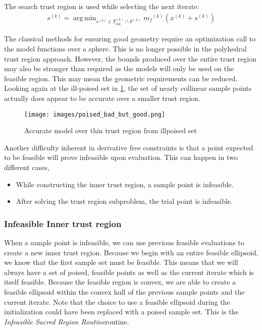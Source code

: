 \documentclass{article}
\theoremstyle{case}
\newcommand{\modelk}{{{m}_f}^{(k)}}
\newcommand{\iteratek}{{x}^{(k)}}
\newcommand{\trialk}{{{s}^{(k)}}}
\newcommand{\outertrk}{{T_{\text{out}}^{(k)}}}
\newcommand{\feasiblek}{{F}^{(k)}}
\DeclareMathOperator*{\argmin}{arg\,min}
\newcommand{\infeasiblesacred}{\emph{Infeasible Sacred Region Routine}}
\begin{document}
The search trust region is used while selecting the next iterate:
\begin{align*}
\trialk = \argmin_{\trialk \in \outertrk \cap \feasiblek} \modelk(\iteratek + \trialk)
\end{align*}


The classical methods for ensuring good geometry require an optimization call to the model functions over a sphere.
This is no longer possible in the polyhedral trust region approach.
However, the bounds produced over the entire trust region may also be stronger than required as the models will only be used on the feasible region.
This may mean the geometric requirements can be reduced.
Looking again at the ill-poised set in \cref{aoip}, the set of nearly collinear sample points actually does appear to be accurate over a smaller trust region.


\begin{figure}[h]
    \centering
    \texttt{[image: images/poised\_bad\_but\_good.png]}
    \caption{Accurate model over thin trust region from illpoised set}
    \label{aoip}
\end{figure}



Another difficulty inherent in derivative free constraints is that a point expected to be feasible will prove infeasible upon evaluation.
This can happen in two different cases, 
\begin{itemize}
	\item While constructing the inner trust region, a sample point is infeasible.
	\item After solving the trust region subproblem, the trial point is infeasible.
\end{itemize}

\subsubsection{Infeasible Inner trust region}

When a sample point is infeasible, we can use previous feasible evaluations to create a new inner trust region.
Because we begin with an entire feasible ellipsoid, we know that the first sample set must be feasible.
This means that we will always have a set of poised, feasible points as well as the current iterate which is itself feasible.
Because the feasible region is convex, we are able to create a feasible ellipsoid within the convex hull of the previous sample points and the current iterate.
Note that the choice to use a feasible ellipsoid during the initialization could have been replaced with a poised sample set.
This is the \infeasiblesacred routine.
\end{document}
